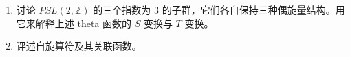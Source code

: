 \begin{enumerate}[start=3]
  {\small\itshape ［原文标记：ETC.（等等）］}

  这里我们引入了半整数能级的 theta 函数。

  定义：

  {\small\itshape ［原文标记：取决于我们在「带电粒子绕环运动」那一节里讲了多少，此处就直接回指那里。］}

  \begin{equation}
    \vartheta\left[\genfrac{}{}{0pt}{}{\theta}{\phi}\right](z|\tau)
    := \sum_{n\in\mathbb{Z}}
    e^{i\pi\tau(n+\theta)^2+2\pi i(n+\theta)(z+\phi)}
    \tag{2.344}
    \label{eq:2.344}
  \end{equation}

  \begin{equation}
    \begin{aligned}
      \vartheta_1(z|\tau) &:= \vartheta\left[\genfrac{}{}{0pt}{}{1/2}{1/2}\right](z|\tau)
      = 2q^{1/8}\cos\left[\pi\left(z+\tfrac12\right)\right]+2q^{9/8}\cos\left[3\pi\left(z+\tfrac12\right)\right]+\cdots\\
      \vartheta_2(z|\tau) &:= \vartheta\left[\genfrac{}{}{0pt}{}{1/2}{0}\right](z|\tau)
      = 2q^{1/8}\cos(\pi z)+2q^{9/8}\cos(3\pi z)+\cdots\\
      \vartheta_3(z|\tau) &:= \vartheta\left[\genfrac{}{}{0pt}{}{0}{0}\right](z|\tau)
      = 1+2\cos[2\pi z]\,q^{1/2}+2\cos[4\pi z]\,q^{2}+\cdots\\
      \vartheta_4(z|\tau) &:= \vartheta\left[\genfrac{}{}{0pt}{}{0}{1/2}\right](z|\tau)
      = 1-2q^{1/2}\cos[2\pi z]+2q^{2}\cos[4\pi z]+\cdots
    \end{aligned}
    \tag{2.345}
    \label{eq:2.345}
  \end{equation}

  {\small\itshape ［原文标记：还要给出无穷乘积表示。这些公式都应当放进附录。］}

  \item 讨论 $PSL(2,\mathbb{Z})$ 的三个指数为 3 的子群，它们各自保持三种偶旋量结构。用它来解释上述 theta 函数的 $S$ 变换与 $T$ 变换。

  \item 评述自旋算符及其关联函数。
\end{enumerate}

